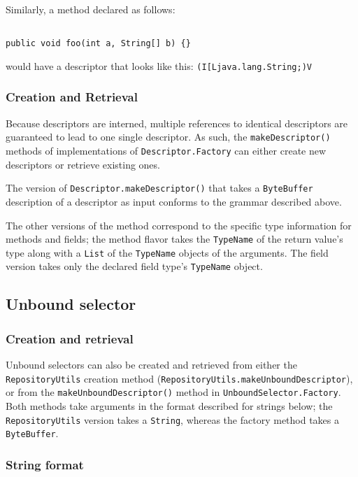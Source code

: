 \documentclass{report}
\begin{document}
Similarly, a method declared as follows:
\begin{verbatim}

public void foo(int a, String[] b) {}

\end{verbatim}
\noindent
would have a descriptor that looks like this: \texttt{(I[Ljava.lang.String;)V}

\subsubsection{Creation and Retrieval}
Because descriptors are interned, multiple references to identical
descriptors are guaranteed to lead to one single descriptor. As such,
the \texttt{makeDescriptor()} methods of implementations of
\texttt{Descriptor.Fac\-tory} can either create new descriptors
or retrieve existing ones. 

The version of \texttt{Descriptor.makeDescriptor()} that takes
a \texttt{Byte\-Buff\-er} description of a descriptor as input conforms
to the grammar described above.

The other versions of the method correspond to the specific type information
for methods and fields; the method flavor takes the \texttt{TypeName} of
the return value's type along with a \texttt{List} of the \texttt{TypeName}
objects of the arguments. The field version takes only the declared field
type's \texttt{TypeName} object.

\subsection{Unbound selector}\label{compunbound}

\subsubsection{Creation and retrieval}

Unbound selectors can also be created and retrieved from either the 
\texttt{Re\-pos\-i\-tory\-Utils} creation method 
(\texttt{Re\-pos\-i\-tory\-Utils.make\-Un\-bound\-De\-scrip\-tor}), or from the
\texttt{make\-Un\-bound\-De\-scrip\-tor()} method in 
\texttt{Un\-bound\-Se\-lec\-tor.Fac\-tory}. Both methods take
arguments in the format described for strings below; the 
\texttt{Re\-pos\-i\-tory\-Utils} version takes a \texttt{String}, whereas the 
factory method takes a \texttt{Byte\-Buff\-er}.

\subsubsection{String format}
\end{document}
